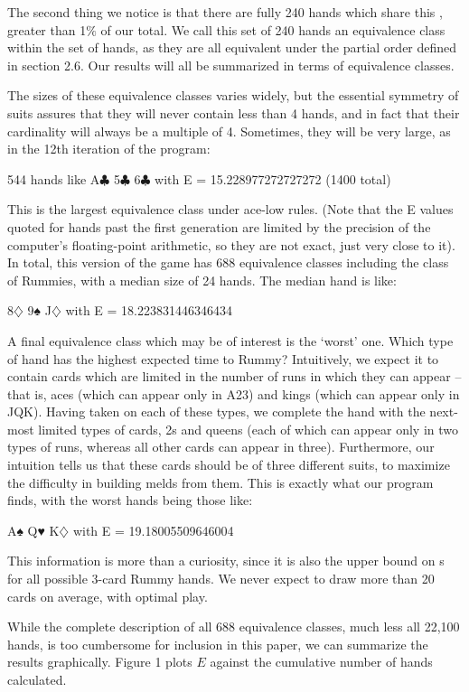 \documentclass[paper=a4, fontsize=11pt,twoside]{report}   %
\begin{document}
The second thing we notice is that there are fully 240 hands which share this , greater than 1$\%$ of our total. We call this set of 240 hands an equivalence class within the set of hands, as they are all equivalent under the partial order defined in section 2.6. Our results will all be summarized in terms of equivalence classes. 

The sizes of these equivalence classes varies widely, but the essential symmetry of suits assures that they will never contain less than 4 hands, and in fact that their cardinality will always be a multiple of 4. Sometimes, they will be very large, as in the 12th iteration of the program: 

544 hands like A$\clubsuit$ 5$\clubsuit$ 6$\clubsuit$ with E = 15.228977272727272 (1400 total) 

This is the largest equivalence class under ace-low rules. (Note that the E values quoted for hands past the first generation are limited by the precision of the computer’s floating-point arithmetic, so they are not exact, just very close to it). In total, this version of the game has 688 equivalence classes including the class of Rummies, with a median size of 24 hands. The median hand is like: 

8$\diamondsuit$ 9♠ J$\diamondsuit$ with E = 18.223831446346434 

A final equivalence class which may be of interest is the ‘worst’ one. Which type of hand has the highest expected time to Rummy?  Intuitively, we expect it to contain cards which are limited in the number of runs in which they can appear – that is, aces (which can appear only in A23) and kings (which can appear only in JQK). Having taken on each of these types, we complete the hand with the next-most limited types of cards, 2s and queens (each of which can appear only in two types of runs, whereas all other cards can appear in three). Furthermore, our intuition tells us that these cards should be of three different suits, to maximize the difficulty in building melds from them. This is exactly what our program finds, with the worst hands being those like: 

A♠ Q♥ K$\diamondsuit$ with E = 19.18005509646004 

This information is more than a curiosity, since it is also the upper bound on s for all possible 3-card Rummy hands. We never expect to draw more than 20 cards on average, with optimal play. 

While the complete description of all 688 equivalence classes, much less all 22,100 hands, is too cumbersome for inclusion in this paper, we can summarize the results graphically. Figure 1 plots $E$ against the cumulative number of hands calculated.
\end{document}
